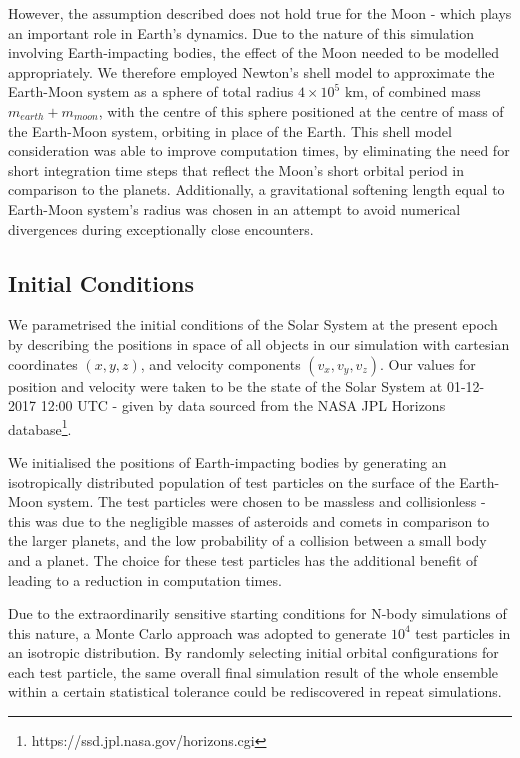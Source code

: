 However, the assumption described does not hold true for the Moon - which plays an important role in Earth's dynamics. Due to the nature of this simulation involving Earth-impacting bodies, the effect of the Moon needed to be modelled appropriately. We therefore employed Newton's shell model to approximate the Earth-Moon system as a sphere of total radius $4\times10^5$ km, of combined mass $m_{earth}+m_{moon}$, with the centre of this sphere positioned at the centre of mass of the Earth-Moon system, orbiting in place of the Earth. This shell model consideration was able to improve computation times, by eliminating the need for short integration time steps that reflect the Moon's short orbital period in comparison to the planets. Additionally, a gravitational softening length equal to Earth-Moon system's radius was chosen in an attempt to avoid numerical divergences during exceptionally close encounters.

\subsection{Initial Conditions}

We parametrised the initial conditions of the Solar System at the present epoch by describing the positions in space of all objects in our simulation with cartesian coordinates $(x,y,z)$, and velocity components $(v_x, v_y, v_z)$. Our values for position and velocity were taken to be the state of the Solar System at 01-12-2017 12:00 UTC - given by data sourced from the NASA JPL Horizons database\footnote{https://ssd.jpl.nasa.gov/horizons.cgi}.

We initialised the positions of Earth-impacting bodies by generating an isotropically distributed population of test particles on the surface of the Earth-Moon system. The test particles were chosen to be massless and collisionless -  this was due to the negligible masses of asteroids and comets in comparison to the larger planets, and the low probability of a collision between a small body and a planet. The choice for these test particles has the additional benefit of leading to a reduction in computation times.

Due to the extraordinarily sensitive starting conditions for N-body simulations of this nature, a Monte Carlo approach was adopted to generate $10^4$ test particles in an isotropic distribution. By randomly selecting initial orbital configurations for each test particle, the same overall final simulation result of the whole ensemble within a certain statistical tolerance could be rediscovered in repeat simulations.

